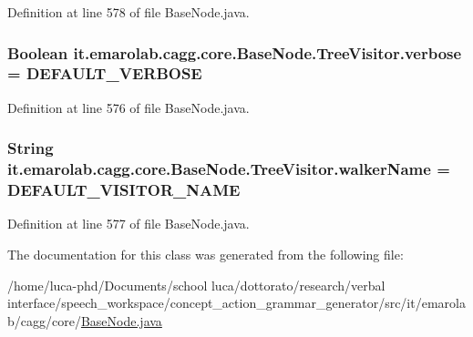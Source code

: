Definition at line 578 of file Base\-Node.\-java.

\hypertarget{classit_1_1emarolab_1_1cagg_1_1core_1_1BaseNode_1_1TreeVisitor_a08821e56497abdbac48f874f8946b335}{
\subsubsection[{verbose}]{\setlength{\rightskip}{0pt plus 5cm}Boolean it.\-emarolab.\-cagg.\-core.\-Base\-Node.\-Tree\-Visitor.\-verbose = {\bf D\-E\-F\-A\-U\-L\-T\-\_\-\-V\-E\-R\-B\-O\-S\-E}\hspace{0.3cm}{\ttfamily [private]}}}\label{classit_1_1emarolab_1_1cagg_1_1core_1_1BaseNode_1_1TreeVisitor_a08821e56497abdbac48f874f8946b335}


Definition at line 576 of file Base\-Node.\-java.

\hypertarget{classit_1_1emarolab_1_1cagg_1_1core_1_1BaseNode_1_1TreeVisitor_aa7178eb73b988619412baf1d4f97b703}{
\subsubsection[{walker\-Name}]{\setlength{\rightskip}{0pt plus 5cm}String it.\-emarolab.\-cagg.\-core.\-Base\-Node.\-Tree\-Visitor.\-walker\-Name = {\bf D\-E\-F\-A\-U\-L\-T\-\_\-\-V\-I\-S\-I\-T\-O\-R\-\_\-\-N\-A\-M\-E}\hspace{0.3cm}{\ttfamily [protected]}}}\label{classit_1_1emarolab_1_1cagg_1_1core_1_1BaseNode_1_1TreeVisitor_aa7178eb73b988619412baf1d4f97b703}


Definition at line 577 of file Base\-Node.\-java.



The documentation for this class was generated from the following file\-:\begin{DoxyCompactItemize}
\item 
/home/luca-\/phd/\-Documents/school luca/dottorato/research/verbal interface/speech\-\_\-workspace/concept\-\_\-action\-\_\-grammar\-\_\-generator/src/it/emarolab/cagg/core/\hyperlink{BaseNode_8java}{Base\-Node.\-java}\end{DoxyCompactItemize}
